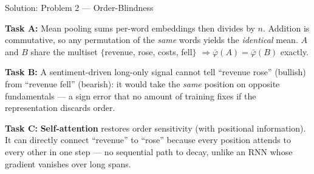 \documentclass[9pt,t]{beamer}
\begin{document}
\begin{frame}{Solution: Problem 2 --- Order-Blindness}

\textbf{Task A:} Mean pooling sums per-word embeddings then divides by $n$.
Addition is commutative, so any permutation of the \emph{same} words yields the
\emph{identical} mean. $A$ and $B$ share the multiset
$\{$revenue, rose, costs, fell$\}$ $\Rightarrow \bar\varphi(A)=\bar\varphi(B)$ exactly.

\medskip
\textbf{Task B:} A sentiment-driven long-only signal cannot tell ``revenue rose''
(bullish) from ``revenue fell'' (bearish): it would take the \emph{same} position
on opposite fundamentals --- a sign error that no amount of training fixes if the
representation discards order.

\medskip
\textbf{Task C:} \textbf{Self-attention} restores order sensitivity (with
positional information). It can directly connect ``revenue'' to ``rose'' because
every position attends to every other in one step --- no sequential path to
decay, unlike an RNN whose gradient vanishes over long spans.
\end{frame}
\end{document}
